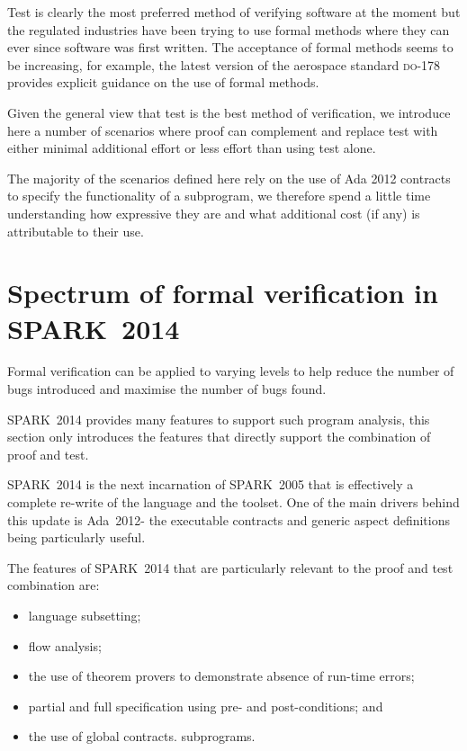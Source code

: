 \documentclass{llncs}
\newcommand{\DO}{\textsc{do-178}\xspace}
\newcommand{\oldspark}{SPARK~2005\xspace}
\newcommand{\newspark}{SPARK~2014\xspace}
\newcommand{\adatwtw}{Ada~2012\xspace}
\begin{document}
Test is clearly the most preferred method of verifying software at the moment but the regulated industries have been trying to use formal methods where they can ever since software was first written. The acceptance of formal methods seems to be increasing, for example, the latest version of the aerospace standard \DO provides explicit guidance on the use of formal methods. 

Given the general view that test is the best method of verification, we introduce here a number of scenarios where proof can complement and replace test with either minimal additional effort or less effort than using test alone.

The majority of the scenarios defined here rely on the use of Ada 2012 contracts to specify the functionality of a subprogram, we therefore spend a little time understanding how expressive they are and what additional cost (if any) is attributable to their use.


\section{Spectrum of formal verification in \newspark}

Formal verification can be applied to varying levels to help reduce the number of bugs introduced and maximise the number of bugs found.

\newspark provides many features to support such program analysis, this section only introduces the features that directly support the combination of proof and test.

\newspark is the next incarnation of \oldspark \cite{sparkbook2012} that is effectively a complete re-write of the language and the toolset. One of the main drivers behind this update is \adatwtw - the executable contracts and generic aspect definitions being particularly useful.

The features of \newspark that are particularly relevant to the proof and test combination are:
\begin{itemize}
   \item language subsetting;
   \item flow analysis;
   \item the use of theorem provers to demonstrate absence of run-time errors;
   \item partial and full specification using pre- and post-conditions; and
   \item the use of global contracts.
subprograms.
\end{itemize}
\end{document}
